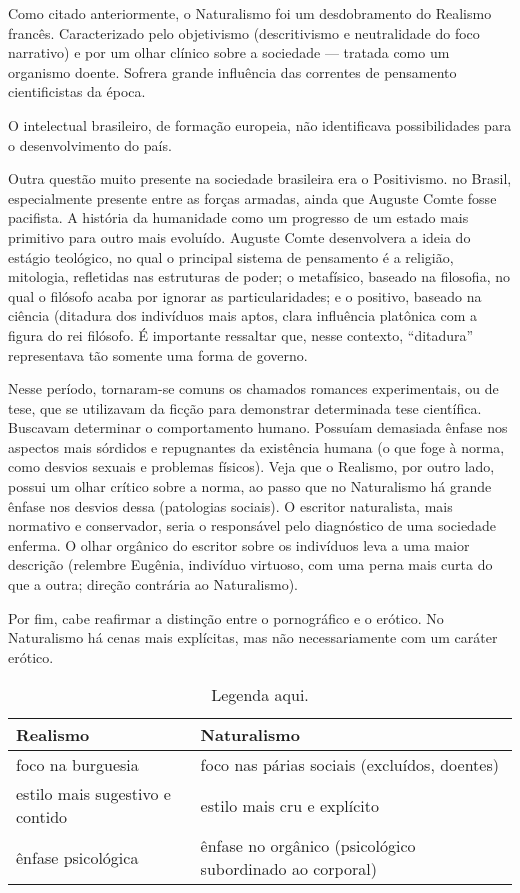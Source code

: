 Como citado anteriormente, o Naturalismo foi um desdobramento do Realismo francês. Caracterizado pelo objetivismo (descritivismo e neutralidade do foco narrativo) e por um olhar clínico sobre a sociedade — tratada como um organismo doente. Sofrera grande influência das correntes de pensamento cientificistas da época.

O intelectual brasileiro, de formação europeia, não identificava possibilidades para o desenvolvimento do país.

Outra questão muito presente na sociedade brasileira era o Positivismo. no Brasil, especialmente presente entre as forças armadas, ainda que Auguste Comte fosse pacifista. A história da humanidade como um progresso de um estado mais primitivo para outro mais evoluído. Auguste Comte desenvolvera a ideia do estágio teológico, no qual o principal sistema de pensamento é a religião, mitologia, refletidas nas estruturas de poder; o metafísico, baseado na filosofia, no qual o filósofo acaba por ignorar as particularidades; e o positivo, baseado na ciência (ditadura dos indivíduos mais aptos, clara influência platônica com a figura do rei filósofo. É importante ressaltar que, nesse contexto, ``ditadura'' representava tão somente uma forma de governo.

Nesse período, tornaram-se comuns os chamados romances experimentais, ou de tese, que se utilizavam da ficção para demonstrar determinada tese científica. Buscavam determinar o comportamento humano. Possuíam demasiada ênfase nos aspectos mais sórdidos e repugnantes da existência humana (o que foge à norma, como desvios sexuais e problemas físicos). Veja que o Realismo, por outro lado, possui um olhar crítico sobre a norma, ao passo que no Naturalismo há grande ênfase nos desvios dessa (patologias sociais). O escritor naturalista, mais normativo e conservador, seria o responsável pelo diagnóstico de uma sociedade enferma. O olhar orgânico do escritor sobre os indivíduos leva a uma maior descrição (relembre Eugênia, indivíduo virtuoso, com uma perna mais curta do que a outra; direção contrária ao Naturalismo).

Por fim, cabe reafirmar a distinção entre o pornográfico e o erótico. No Naturalismo há cenas mais explícitas, mas não necessariamente com um caráter erótico.

\begin{table}[h]
\centering
\begin{tabular}{l l}
\toprule
\textbf{Realismo} & \textbf{Naturalismo} \\
\midrule
foco na burguesia & foco nas párias sociais (excluídos, doentes) \\
estilo mais sugestivo e contido & estilo mais cru e explícito \\
ênfase psicológica & ênfase no orgânico (psicológico subordinado ao corporal) \\
\bottomrule
\end{tabular}
\caption{Legenda aqui.}
\end{table}